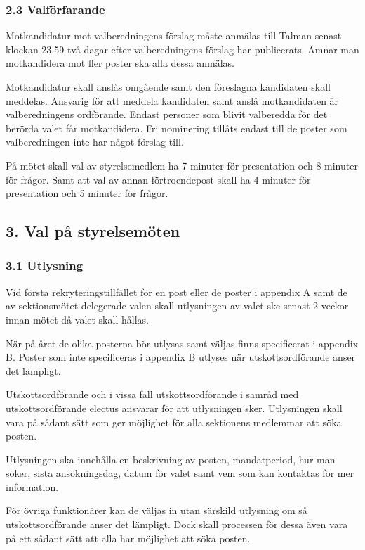 \documentclass{dsekkallelse}
\begin{document}
\subsubsection{2.3 Valförfarande}
Motkandidatur mot valberedningens förslag måste anmälas till Talman senast klockan 23.59 två dagar efter valberedningens förslag har publicerats. Ämnar man motkandidera mot fler poster ska alla dessa anmälas.

Motkandidatur skall anslås omgående samt den föreslagna kandidaten skall meddelas. Ansvarig för att meddela kandidaten samt anslå motkandidaten är valberedningens ordförande. Endast personer som blivit valberedda för det berörda valet får motkandidera.
Fri nominering tillåts endast till de poster som valberedningen inte har något förslag till.

På mötet skall val av styrelsemedlem ha 7 minuter för presentation och 8 minuter för frågor. Samt att val av annan förtroendepost skall ha 4 minuter för presentation och 5 minuter för frågor.

\subsection{3. Val på styrelsemöten}

\subsubsection{3.1 Utlysning}
Vid första rekryteringstillfället för en post eller de poster i appendix A samt de av sektionsmötet delegerade valen skall utlysningen av valet ske senast 2 veckor innan mötet då valet skall hållas. 

När på året de olika posterna bör utlysas samt väljas finns specificerat i appendix B. Poster som inte specificeras i appendix B utlyses när utskottsordförande anser det lämpligt. 

Utskottsordförande och i vissa fall utskottsordförande i samråd med utskottsordförande electus ansvarar för att utlysningen sker. Utlysningen skall vara på sådant sätt som ger möjlighet för alla sektionens medlemmar att söka posten. 

Utlysningen ska innehålla en beskrivning av posten, mandatperiod, hur man söker, sista ansökningsdag, datum för valet samt vem som kan kontaktas för mer information. 

För övriga funktionärer kan de väljas in utan särskild utlysning om så utskottsordförande anser det lämpligt. Dock skall processen för dessa även vara på ett sådant sätt att alla har möjlighet att söka posten. 
\end{document}

